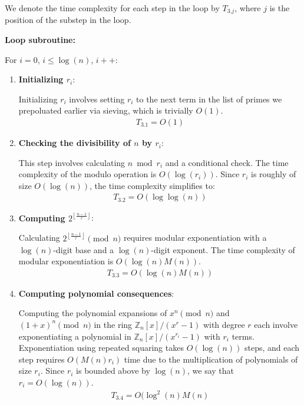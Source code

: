 \documentclass{article}
\theoremstyle{plain}
\theoremstyle{definition}
\newcommand{\floor}[1]{\left\lfloor #1 \right\rfloor}
\newcommand{\Z}{\mathbb{Z}}
\newcommand{\D}{r}
\begin{document}
\begin{enumerate}[label*=\arabic*.]
    We denote the time complexity for each step in the loop by $T_{3.j}$, where $j$ is the position of the substep in the loop.

    \textbf{Loop subroutine:}
    
    For $i=0$, $i \leq \log(n)$, $i++$:
    \begin{enumerate}[label*=\arabic*.]
        \item \textbf{Initializing $\D_i$}:
        
        Initializing $\D_i$ involves setting $\D_i$ to the next term in the list of primes we prepoluated earlier via sieving, which is trivially $O(1)$.
        \begin{align}
            T_{3.1} = O(1)
        \end{align}
        
        \item \textbf{Checking the divisibility of $n$ by $\D_i$}:
        
        This step involves calculating $n \bmod{\D_i}$ and a conditional check. The time complexity of the modulo operation is $O(\log(\D_i))$. Since $\D_i$ is roughly of size $O(\log(n))$, the time complexity simplifies to:
        \begin{align}
            T_{3.2} = O(\log\log(n))
        \end{align}
        
        \item \textbf{Computing $2^{\floor{\frac{n-1}{\D}}}$}:
        
        Calculating $2^{\floor{\frac{n-1}{\D}}} \pmod{n}$ requires modular exponentiation with a $\log(n)$-digit base and a $\log(n)$-digit exponent. The time complexity of modular exponentiation is $O(\log(n) M(n))$.
        \begin{align}
            T_{3.3} = O(\log(n) M(n))
        \end{align}
        
        \item \textbf{Computing polynomial consequences}:
        
        Computing the polynomial expansions of $x^n \pmod{n}$ and $(1+x)^n \pmod{n}$ in the ring $\Z_n[x]/(x^\D-1)$ with degree $\D$ each involve exponentiating a polynomial in $\Z_n[x]/(x^{\D_i}-1)$ with $\D_i$ terms. Exponentiation using repeated squaring takes $O(\log(n))$ steps, and each step requires $O(M(n) \D_i)$ time due to the multiplication of polynomials of size $\D_i$. Since $\D_i$ is bounded above by $\log(n)$, we say that $\D_i = O(\log(n))$.
        \begin{align}
            T_{3.4} = O(\log^2(n) M(n)
        \end{align}
             

\end{enumerate}
\end{enumerate}
\end{document}
